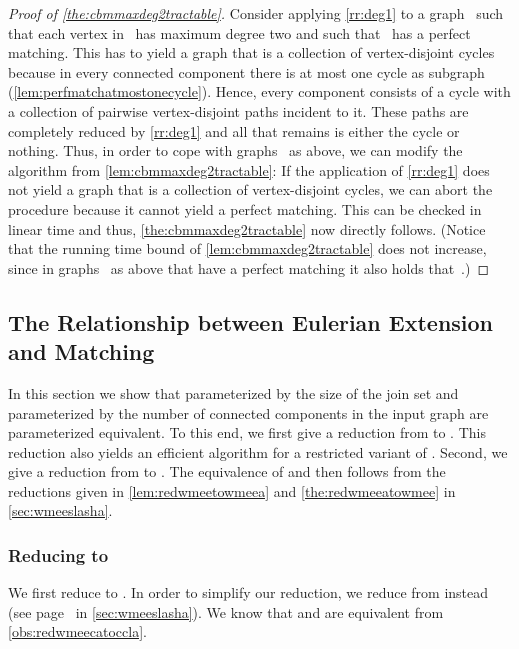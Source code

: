 \begin{proof}[Proof of \autoref{the:cbmmaxdeg2tractable}]
Consider applying \autoref{rr:deg1} to a graph~ such that each vertex in~ has maximum degree two and such that~ has a perfect matching. This has to yield a graph that is a collection of vertex-disjoint cycles because in every connected component there is at most one cycle as subgraph (\autoref{lem:perfmatchatmostonecycle}). Hence, every component consists of a cycle with a collection of pairwise vertex-disjoint paths incident to it. These paths are completely reduced by \autoref{rr:deg1} and all that remains is either the cycle or nothing. Thus, in order to cope with graphs~ as above, we can modify the algorithm from \autoref{lem:cbmmaxdeg2tractable}: If the application of \autoref{rr:deg1} does not yield a graph that is a collection of vertex-disjoint cycles, we can abort the procedure because it cannot yield a perfect matching. This can be checked in linear time and thus, \autoref{the:cbmmaxdeg2tractable} now directly follows. (Notice that the running time bound of \autoref{lem:cbmmaxdeg2tractable} does not increase, since in graphs~ as above that have a perfect matching it also holds that~.)
\end{proof}



\subsection{The Relationship between Eulerian Extension and Matching} \label{sec:releecbm}

In this section we show that \pCBMs{} parameterized by the size of the join set and \pWMEEs{} parameterized by the number of connected components in the input graph are parameterized equivalent. To this end, we first give a reduction from \pWMEECAs{} to \pCBMs{}. This reduction also yields an efficient algorithm for a restricted variant of \pWMEEs{}. Second, we give a reduction from \pCBMs{} to \pWMEEAs{}. The equivalence of \pWMEEs{} and \pCBMs{} then follows from the reductions given in \autoref{lem:redwmeetowmeea} and \autoref{the:redwmeeatowmee} in \autoref{sec:wmeeslasha}.



\subsubsection{Reducing \pWMEECAs{} to \pCBMs{}}
We first reduce \pWMEECAs{} to \pCBMs{}. In order to simplify our reduction, we reduce from \pWMEECCLAs{} instead (see page~\pageref{def:pWMEECA} in \autoref{sec:wmeeslasha}). We know that \pWMEECCLAs{} and \pWMEECAs{} are equivalent from \autoref{obs:redwmeecatoccla}.

